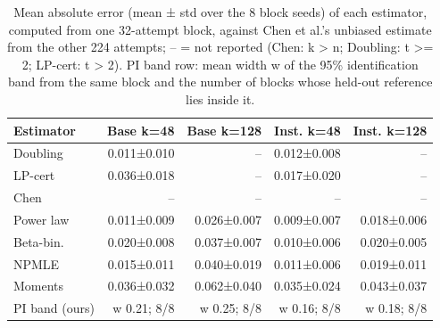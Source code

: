 \begin{table}[t]
\centering
\small
\begin{tabular}{lrrrr}
\toprule
Estimator & Base k=48 & Base k=128 & Inst. k=48 & Inst. k=128 \\
\midrule
Doubling & 0.011±0.010 & -- & 0.012±0.008 & -- \\
LP-cert & 0.036±0.018 & -- & 0.017±0.020 & -- \\
Chen & -- & -- & -- & -- \\
Power law & 0.011±0.009 & 0.026±0.007 & 0.009±0.007 & 0.018±0.006 \\
Beta-bin. & 0.020±0.008 & 0.037±0.007 & 0.010±0.006 & 0.020±0.005 \\
NPMLE & 0.015±0.011 & 0.040±0.019 & 0.011±0.006 & 0.019±0.011 \\
Moments & 0.036±0.032 & 0.062±0.040 & 0.035±0.024 & 0.043±0.037 \\
PI band (ours) & w 0.21; 8/8 & w 0.25; 8/8 & w 0.16; 8/8 & w 0.18; 8/8 \\
\bottomrule
\end{tabular}
\caption{Mean absolute error (mean ± std over the 8 block seeds) of each estimator, computed from one 32-attempt block, against Chen et al.'s unbiased estimate from the other 224 attempts; -- = not reported (Chen: k > n; Doubling: t >= 2; LP-cert: t > 2). PI band row: mean width w of the 95\% identification band from the same block and the number of blocks whose held-out reference lies inside it.}
\label{tab:T3_estimator_comparison}
\end{table}
